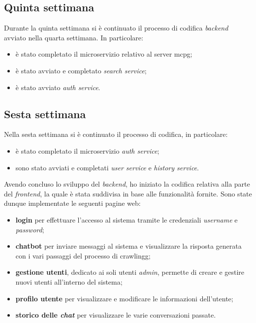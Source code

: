 \subsection{Quinta settimana}
Durante la quinta settimana si è continuato il processo di codifica \textit{backend} avviato nella quarta settimana. In particolare:
\begin{itemize}
    \item è stato completato il microservizio relativo al server \gls{mcpg};
    \item è stato avviato e completato \textit{search service};
    \item è stato avviato \textit{auth service}.
\end{itemize}

\subsection{Sesta settimana}
Nella sesta settimana si è continuato il processo di codifica, in particolare:
\begin{itemize}
    \item è stato completato il microservizio \textit{auth service};
    \item sono stato avviati e completati \textit{user service} 
    e \textit{history service}.
\end{itemize}
Avendo concluso lo sviluppo del \textit{backend}, ho iniziato 
la codifica relativa alla parte del \textit{frontend}, la quale è stata 
suddivisa in base alle funzionalità fornite. Sono state dunque 
implementate le seguenti pagine web:
\begin{itemize}
    \item \textbf{login} per effettuare l'accesso al sistema tramite le 
    credenziali \textit{username} e \textit{password};
    \item \textbf{chatbot} per inviare messaggi al sistema e visualizzare 
    la risposta generata con i vari passaggi del processo di \gls{crawlingg};
    \item \textbf{gestione utenti}, dedicato ai soli utenti \textit{admin}, 
    permette di creare e gestire nuovi utenti all'interno del sistema;
    \item \textbf{profilo utente} per visualizzare e modificare le 
    informazioni dell'utente;
    \item \textbf{storico delle \textit{chat}} per visualizzare le varie 
    conversazioni passate.
\end{itemize}


